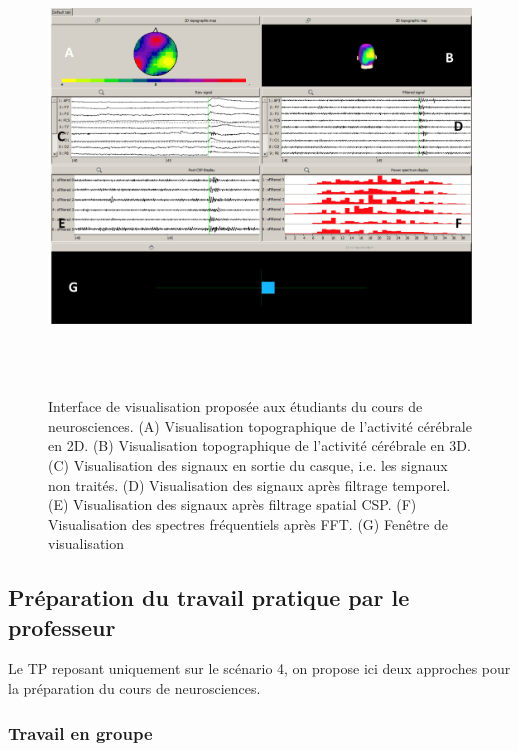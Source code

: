 \begin{figure}[h]
	\centering\includegraphics[height=12cm]{images/cours_neuro.png}
	\caption[Interface de visualisation proposée aux étudiants du cours de neurosciences]{Interface de visualisation proposée aux étudiants du cours de neurosciences. (A) Visualisation topographique de l'activité cérébrale en 2D. (B) Visualisation topographique de l'activité cérébrale en 3D. (C) Visualisation des signaux en sortie du casque, i.e. les signaux non traités. (D) Visualisation des signaux après filtrage temporel. (E) Visualisation des signaux après filtrage spatial CSP. (F) Visualisation des spectres fréquentiels après FFT. (G) Fenêtre de visualisation  }
	\label{cours_neuro}
\end{figure}

\subsection{Préparation du travail pratique par le professeur}

Le TP reposant uniquement sur le scénario 4, on propose ici deux approches pour la préparation du cours de neurosciences.

\subsubsection{Travail en groupe}


